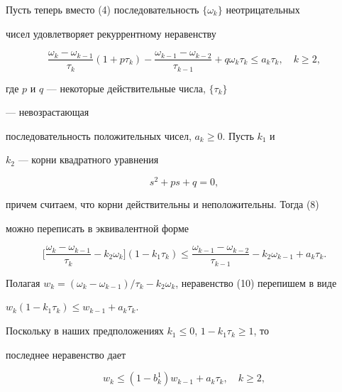 Пусть теперь вместо (4) последовательность $\{\omega_k\}$ неотрицательных


чисел удовлетворяет рекуррентному неравенству


\begin{equation}\label {8}


\frac{\omega_k -\omega_{k-1}}{\tau_k}(1+p \tau_k)-


\frac{\omega_{k-1} -\omega_{k-2}}{\tau_{k-1}}+q\omega_k \tau_k \leq


a_k\tau_k,\quad k\geq 2,


\end{equation}


где $p$ и $q$ --- некоторые действительные числа, $\{\tau_k\}$


--- невозрастающая


последовательность положительных чисел, $a_k \geq 0$. Пусть $k_1$ и


$k_2$ --- корни квадратного уравнения


\begin{equation}\label {9}


s^2+ps+q=0,


\end{equation}


причем считаем, что корни действительны и неположительны. Тогда (8)


можно переписать в эквивалентной форме


\begin{equation}\label {10}


\bigg[\frac{\omega_k -\omega_{k-1}}{\tau_k}-k_2\omega_k\bigg]


(1-k_1\tau_k) \leq \frac{\omega_{k-1} -\omega_{k-2}}{\tau_{k-1}}-


k_2\omega_{k-1}+a_k\tau_k.


\end{equation}


Полагая $w_k=(\omega_k -\omega_{k-1})/ \tau_k-


k_2\omega_k$, неравенство (10) перепишем в виде


$w_k(1-k_1\tau_k)\leq w_{k-1}+a_k\tau_k$.


Поскольку в наших предположениях $k_1\leq 0$, $1-k_1\tau_k \geq 1$, то


последнее неравенство дает


\begin{equation}\label {11}


w_k \leq (1-b_k^1)w_{k-1}+a_k\tau_k, \quad k \geq 2,


\end{equation}


